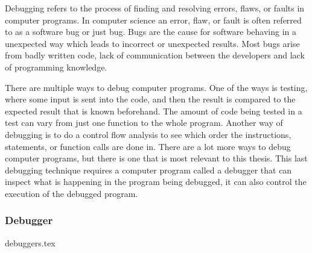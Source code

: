  

Debugging refers to the process of finding and resolving errors, flaws, or faults in computer programs.
In computer science an error, flaw, or fault is often referred to as a software bug or just bug.
Bugs are the cause for software behaving in a unexpected way which leads to incorrect or unexpected results.
Most bugs arise from badly written code, lack of communication between the developers and lack of programming knowledge.


There are multiple ways to debug computer programs.
One of the ways is testing, where some input is sent into the code, and then the result is compared to the expected result that is known beforehand.
The amount of code being tested in a test can vary from just one function to the whole program.
Another way of debugging is to do a control flow analysis to see which order the instructions, statements, or function calls are done in.
There are a lot more ways to debug computer programs, but there is one that is most relevant to this thesis.
This last debugging technique requires a computer program called a debugger that can inspect what is happening in the program being debugged, it can also control the execution of the debugged program.



\subsubsection{Debugger}
{debuggers.tex}

